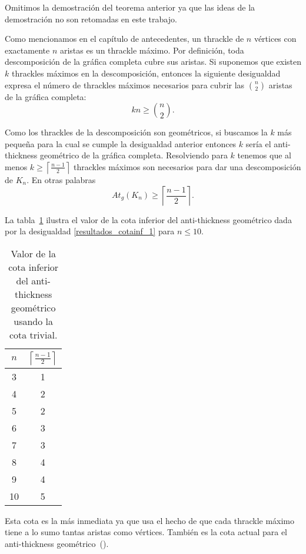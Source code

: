   Omitimos la demostración del teorema anterior ya que las ideas de la
  demostración no son retomadas en este trabajo.

  Como mencionamos en el capítulo de antecedentes, un thrackle de $n$ vértices
  con exactamente $n$ aristas es un thrackle máximo. Por definición, toda
  descomposición de la gráfica completa cubre sus aristas. Si suponemos que
  existen $k$ thrackles máximos en la descomposición, entonces la siguiente
  desigualdad expresa el número de thrackles máximos necesarios para cubrir las
  $\binom{n}{2}$ aristas de la gráfica completa:
  \[ kn \geq \binom{n}{2}. \]

  Como los thrackles de la descomposición son geométricos, si buscamos la $k$ más
  pequeña para la cual se cumple la desigualdad anterior entonces $k$
  sería el anti-thickness geométrico de la gráfica completa.
  Resolviendo para $k$  tenemos que al menos
  $k\geq\left\lceil\frac{n-1}{2}\right\rceil$ thrackles máximos son necesarios
  para dar una descomposición de $K_n$. En otras palabras
  \begin{equation}
    At_g(K_n) \geq  \left\lceil\frac{n-1}{2}\right\rceil.
    \label{resultados_cotainf_1}
  \end{equation}

  La tabla~\ref{table:attrivialinf} ilustra el valor de la cota inferior del
  anti-thickness geométrico dada por la desigualdad \ref{resultados_cotainf_1}
  para $n\leq 10$.
  \begin{table}[t]
    \centering
    \begin{tabular}{|c|c|}
      \hline
      $n$ & $\left\lceil\frac{n-1}{2}\right\rceil$ \\[5pt] \hline\hline
      3   & 1  \\
      4   & 2  \\
      5   & 2  \\
      6   & 3  \\
      7   & 3  \\
      8   & 4  \\
      9   & 4  \\
      10  & 5  \\ \hline
    \end{tabular}
    \caption{ Valor de la cota inferior del anti-thickness geométrico usando la cota trivial. }
    \label{table:attrivialinf}
  \end{table}
  Esta cota es la más inmediata ya que usa el hecho de que cada thrackle máximo tiene a lo sumo tantas aristas como vértices. También es la cota actual para el anti-thickness geométrico~(\cite{Dujmovic2017}).

